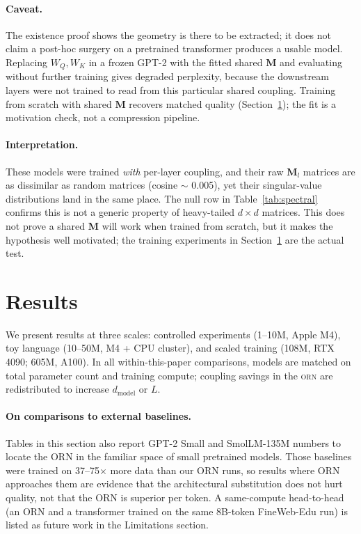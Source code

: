 \documentclass[10pt,twocolumn]{article}
\newcommand{\M}{\mathbf{M}}
\newcommand{\orn}{\textsc{orn}}
\begin{document}
\paragraph{Caveat.}
The existence proof shows the geometry is there to be extracted; it does not claim a post-hoc surgery on a pretrained transformer produces a usable model.
Replacing $W_Q, W_K$ in a frozen GPT-2 with the fitted shared $\M$ and evaluating without further training gives degraded perplexity, because the downstream layers were not trained to read from this particular shared coupling.
Training from scratch with shared $\M$ recovers matched quality (Section~\ref{sec:results}); the fit is a motivation check, not a compression pipeline.

\paragraph{Interpretation.}
These models were trained \emph{with} per-layer coupling, and their raw $\M_l$ matrices are as dissimilar as random matrices (cosine $\sim$ 0.005), yet their singular-value distributions land in the same place.
The null row in Table~\ref{tab:spectral} confirms this is not a generic property of heavy-tailed $d \times d$ matrices.
This does not prove a shared $\M$ will work when trained from scratch, but it makes the hypothesis well motivated; the training experiments in Section~\ref{sec:results} are the actual test.


\section{Results}
\label{sec:results}

We present results at three scales: controlled experiments (1--10M, Apple M4), toy language (10--50M, M4 + CPU cluster), and scaled training (108M, RTX 4090; 605M, A100).
In all within-this-paper comparisons, models are matched on total parameter count and training compute; coupling savings in the \orn{} are redistributed to increase $d_\text{model}$ or $L$.

\paragraph{On comparisons to external baselines.}
Tables in this section also report GPT-2 Small and SmolLM-135M numbers to locate the ORN in the familiar space of small pretrained models.
Those baselines were trained on 37--75$\times$ more data than our ORN runs, so results where ORN approaches them are evidence that the architectural substitution does not hurt quality, not that the ORN is superior per token.
A same-compute head-to-head (an ORN and a transformer trained on the same 8B-token FineWeb-Edu run) is listed as future work in the Limitations section.
\end{document}
